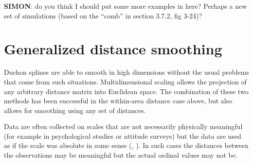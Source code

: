 \textbf{SIMON}: do you think I should put some more examples in here? Perhaps a new set of simulations (based on the ``comb'' in section 3.7.2, fig 3-24)?

\section{Generalized distance smoothing}
\label{gds-gds-examples}

Duchon splines are able to smooth in high dimensions without the usual problems that come from such situations. Multidimensional scaling allows the projection of any arbitrary distance matrix into Euclidean space. The combination of these two methods has been successful in the within-area distance case above, but also allows for smoothing using any set of distances.

Data are often collected on scales that are not necessarily physically meaningful (for example in psychological studies or attitude surveys) but the data are used as if the scale was absolute in some sense (\cite{cox2007}, \cite{torgerson}). In such cases the distances between the observations may be meaningful but the actual ordinal values may not be.

